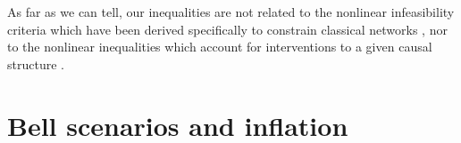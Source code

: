As far as we can tell, our inequalities are not related to the nonlinear infeasibility criteria which have been derived specifically to constrain classical networks \cite{TavakoliStarNetworks,RossetNetworks,TavakoliNoncyclicNetworks}, nor to the nonlinear inequalities which account for interventions to a given causal structure \cite{kang2007polynomialconstraints,steeg2011relaxation}.




\section{Bell scenarios and inflation}
\label{sec:Bellscenarios}

